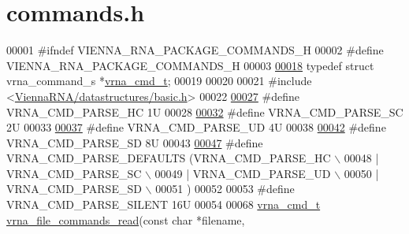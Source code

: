 \hypertarget{commands_8h_source}{}\section{commands.\+h}
\label{commands_8h_source}

\begin{DoxyCode}
00001 \textcolor{preprocessor}{#ifndef VIENNA\_RNA\_PACKAGE\_COMMANDS\_H}
00002 \textcolor{preprocessor}{#define VIENNA\_RNA\_PACKAGE\_COMMANDS\_H}
00003 
\hyperlink{group__command__files_gaf31afe4c5f8e4bf44a670ab4c3dcd916}{00018} \textcolor{keyword}{typedef} \textcolor{keyword}{struct }vrna\_command\_s *\hyperlink{group__command__files_gaf31afe4c5f8e4bf44a670ab4c3dcd916}{vrna\_cmd\_t};
00019 
00020 
00021 \textcolor{preprocessor}{#include <\hyperlink{datastructures_2basic_8h}{ViennaRNA/datastructures/basic.h}>}
00022 
\hyperlink{group__command__files_gac54dec838d7b6bebd5df85f71702d324}{00027} \textcolor{preprocessor}{#define VRNA\_CMD\_PARSE\_HC      1U}
00028 
\hyperlink{group__command__files_ga8cad3c1f83e6f149829c49a186a83e21}{00032} \textcolor{preprocessor}{#define VRNA\_CMD\_PARSE\_SC      2U}
00033 
\hyperlink{group__command__files_ga6c6409780698826b04ebfed9151d7649}{00037} \textcolor{preprocessor}{#define VRNA\_CMD\_PARSE\_UD      4U}
00038 
\hyperlink{group__command__files_gaf5e20210173cdb83bf70256a454f284b}{00042} \textcolor{preprocessor}{#define VRNA\_CMD\_PARSE\_SD      8U}
00043 
\hyperlink{group__command__files_ga0a6c88e21e366dca14958d69cd024008}{00047} \textcolor{preprocessor}{#define VRNA\_CMD\_PARSE\_DEFAULTS (VRNA\_CMD\_PARSE\_HC \(\backslash\)}
00048 \textcolor{preprocessor}{                                 | VRNA\_CMD\_PARSE\_SC \(\backslash\)}
00049 \textcolor{preprocessor}{                                 | VRNA\_CMD\_PARSE\_UD \(\backslash\)}
00050 \textcolor{preprocessor}{                                 | VRNA\_CMD\_PARSE\_SD \(\backslash\)}
00051 \textcolor{preprocessor}{                                 )}
00052 
00053 \textcolor{preprocessor}{#define VRNA\_CMD\_PARSE\_SILENT   16U}
00054 
00068 \hyperlink{group__command__files_gaf31afe4c5f8e4bf44a670ab4c3dcd916}{vrna\_cmd\_t} \hyperlink{group__command__files_gae5f56400ed43683338f7bf1c1102655a}{vrna\_file\_commands\_read}(\textcolor{keyword}{const} \textcolor{keywordtype}{char}   *filename,

\end{DoxyCode}
